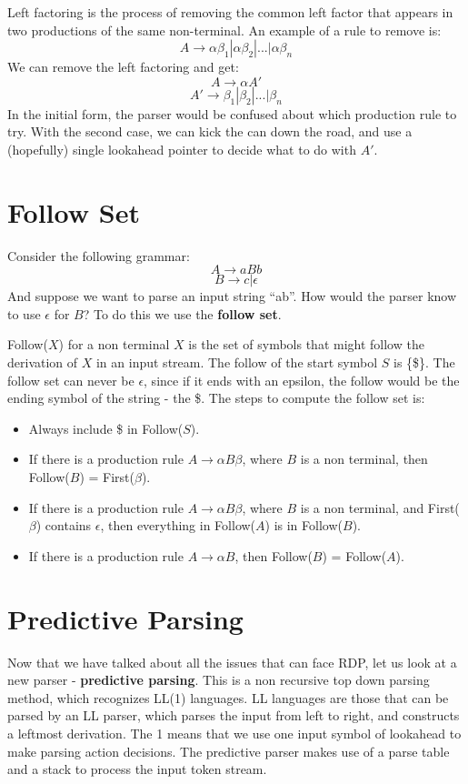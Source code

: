 \documentclass[12pt,letterpaper]{amsbook}
\theoremstyle{definition}
\begin{document}
Left factoring is the process of removing the common left factor that appears in two productions of the same non-terminal. An example of a rule to remove is:
\[A \rightarrow \alpha \beta_1|\alpha \beta_2 | ... | \alpha \beta_n\]
We can remove the left factoring and get:
\[A \rightarrow \alpha A'\]
\[A' \rightarrow \beta_1|\beta_2| ... | \beta_n\]
In the initial form, the parser would be confused about which production rule to try. With the second case, we can kick the can down the road, and use a (hopefully) single lookahead pointer to decide what to do with $A'$.

\section{Follow Set}

Consider the following grammar:
\[A \rightarrow aBb\]
\[B \rightarrow c | \epsilon\]
And suppose we want to parse an input string ``ab''. How would the parser know to use $\epsilon$ for $B$? To do this we use the \textbf{follow set}.

Follow($X$) for a non terminal $X$ is the set of symbols that might follow the derivation of $X$ in an input stream. The follow of the start symbol $S$ is \{\$\}. The follow set can never be $\epsilon$, since if it ends with an epsilon, the follow would be the ending symbol of the string -  the \$. The steps to compute the follow set is:

\begin{itemize}
  \item Always include \$ in Follow($S$).
  \item If there is a production rule $A \rightarrow \alpha B \beta$, where $B$ is a non terminal, then Follow($B$)  = First($\beta$).
  \item If there is a production rule $A \rightarrow \alpha B \beta$, where $B$ is a non terminal, and First($\beta$) contains $\epsilon$, then everything in Follow($A$) is in Follow($B$).
  \item If there is a production rule $A \rightarrow \alpha B$, then Follow($B$) = Follow($A$).
\end{itemize}

\section{Predictive Parsing}

Now that we have talked about all the issues that can face RDP, let us look at a new parser - \textbf{predictive parsing}. This is a non recursive top down parsing method, which recognizes LL(1) languages. LL languages are those that can be parsed by an LL parser, which parses the input from left to right, and constructs a leftmost derivation. The 1 means that we use one input symbol of lookahead to make parsing action decisions. The predictive parser makes use of a parse table and a stack to process the input token stream.
\end{document}
